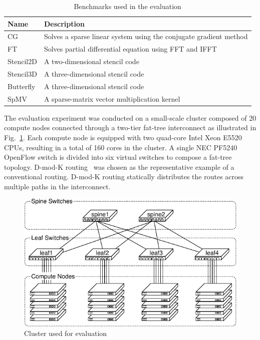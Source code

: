 \documentclass[graybox]{svmult}
\begin{document}
\begin{table}
\caption{Benchmarks used in the evaluation}%
\label{kt:tbl:miniapps}
\begin{tabular}{ll}
\toprule
Name      & Description \\ \midrule
CG        & Solves a sparse linear system using the conjugate gradient method \\
FT        & Solves partial differential equation using FFT and IFFT           \\
Stencil2D & A two-dimensional stencil code                                    \\
Stencil3D & A three-dimensional stencil code                                  \\
Butterfly & A three-dimensional stencil code                                  \\
SpMV      & A sparse-matrix vector multiplication kernel                      \\ \bottomrule
\end{tabular}
\end{table}

The evaluation experiment was conducted on a small-scale cluster composed of
20 compute nodes connected through a two-tier fat-tree interconnect as
illustrated in Fig.~\ref{kt:fig:cluster}. Each compute node is equipped with
two quad-core Intel Xeon E5520 CPUs, resulting in a total of 160 cores in the
cluster. A single NEC PF5240 OpenFlow switch is divided into six virtual
switches to compose a fat-tree topology. D-mod-K routing~\cite{Rodriguez2009}
was chosen as the representative example of a conventional routing. D-mod-K
routing statically distributes the routes across multiple paths in the
interconnect.

\begin{figure}
    \centering
    \includegraphics{evaluation_cluster}
    \caption{Cluster used for evaluation}%
    \label{kt:fig:cluster}
\end{figure}
\end{document}
